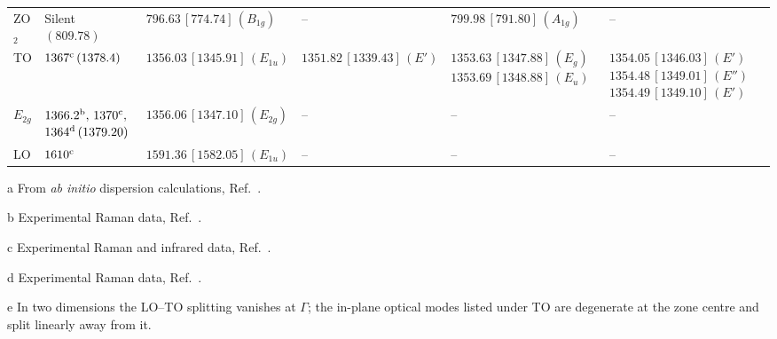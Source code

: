 \begin{table}[htbp]
\begin{threeparttable}
\begin{tabular}{C{0.85cm}C{2.7cm}C{3.1cm}C{2.4cm}C{2.9cm}C{3.0cm}}
ZO$_2$
  & Silent $(809.78)$
  & $796.63\,[774.74]\,(B_{1g})$
  & --
  & $799.98\,[791.80]\,(A_{1g})$
  & -- \\

TO
  & $1367^{\rm c}\,(1378.4)$
  & $1356.03\,[1345.91]\,(E_{1u})$
  & $1351.82\,[1339.43]\,(E')$
  & 
  &  \\

$E_{2g}$
  & 
  & $1356.06\,[1347.10]\,(E_{2g})$
  & --
  & --
  & -- \\

LO
  & $1610^{\rm c}$
  & $1591.36\,[1582.05]\,(E_{1u})$
  & --
  & --
  & -- \\

\bottomrule
\end{tabular}
\begin{tablenotes}
\footnotesize
\item[a] From \emph{ab initio} dispersion calculations, Ref.~\cite{Serrano2007}.
\item[b] Experimental Raman data, Ref.~\cite{Nemanich1981}.
\item[c] Experimental Raman and infrared data, Ref.~\cite{Geick1966}.
\item[d] Experimental Raman data, Ref.~\cite{Reich2005}.
\item[e] In two dimensions the LO--TO splitting vanishes at $\Gamma$; the
in-plane optical modes listed under TO are degenerate at the zone centre and
split linearly away from it.
\end{tablenotes}
\end{threeparttable}
\end{table}
